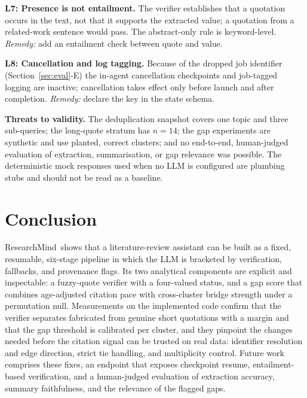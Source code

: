 \documentclass[conference]{IEEEtran}
\newcommand{\RM}{ResearchMind}
\begin{document}
\textbf{L7: Presence is not entailment.} The verifier establishes that a quotation occurs in the text, not that it supports the extracted value; a quotation from a related-work sentence would pass. The abstract-only rule is keyword-level. \emph{Remedy:} add an entailment check between quote and value.

\textbf{L8: Cancellation and log tagging.} Because of the dropped job identifier (Section~\ref{sec:eval}-E) the in-agent cancellation checkpoints and job-tagged logging are inactive; cancellation takes effect only before launch and after completion. \emph{Remedy:} declare the key in the state schema.

\textbf{Threats to validity.} The deduplication snapshot covers one topic and three sub-queries; the long-quote stratum has $n{=}14$; the gap experiments are synthetic and use planted, correct clusters; and no end-to-end, human-judged evaluation of extraction, summarisation, or gap relevance was possible. The deterministic mock responses used when no LLM is configured are plumbing stubs and should not be read as a baseline.

\section{Conclusion}
\label{sec:concl}
\RM\ shows that a literature-review assistant can be built as a fixed, resumable, six-stage pipeline in which the LLM is bracketed by verification, fallbacks, and provenance flags. Its two analytical components are explicit and inspectable: a fuzzy-quote verifier with a four-valued status, and a gap score that combines age-adjusted citation pace with cross-cluster bridge strength under a permutation null. Measurements on the implemented code confirm that the verifier separates fabricated from genuine short quotations with a margin and that the gap threshold is calibrated per cluster, and they pinpoint the changes needed before the citation signal can be trusted on real data: identifier resolution and edge direction, strict tie handling, and multiplicity control. Future work comprises these fixes, an endpoint that exposes checkpoint resume, entailment-based verification, and a human-judged evaluation of extraction accuracy, summary faithfulness, and the relevance of the flagged gaps.
\end{document}
